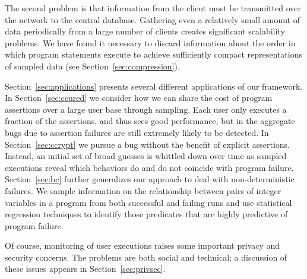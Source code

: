 The second problem is that information from the client must be
transmitted over the network to the central database.  Gathering even
a relatively small amount of data periodically from a large number of
clients creates significant scalability problems.  We have found it necessary
to discard information about the order in which program statements execute
to achieve sufficiently compact representations of sampled data
(see Section~\ref{sec:compression}).

Section~\ref{sec:applications} presents several different applications
of our framework.  In Section~\ref{sec:ccured} we consider how we can
share the cost of program assertions over a large user base through
sampling.  Each user only executes a fraction of the assertions, and
thus sees good performance, but in the aggregate bugs due to assertion
failures are still extremely likely to be detected.  In
Section~\ref{sec:ccrypt} we pursue a bug without the benefit of
explicit assertions.  Instead, an initial set of broad guesses is
whittled down over time as sampled executions reveal which behaviors
do and do not coincide with program failure.  Section~\ref{sec:bc}
further generalizes our approach to deal with non-deterministic
failures.  We sample information on the relationship between pairs of
integer variables in a program from both successful and failing runs
and use statistical regression techniques to identify those predicates
that are highly predictive of program failure.


Of course, monitoring of user executions raises some important privacy
and security concerns.  The problems are both social and technical; a
discussion of these issues appears in Section~\ref{sec:privsec}.

